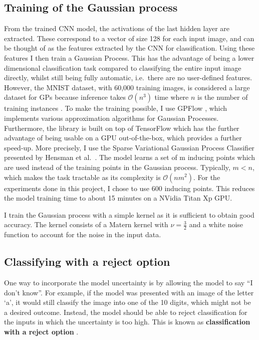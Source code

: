 \documentclass{article}
\begin{document}
\subsection{Training of the Gaussian process}
From the trained CNN model, the activations of the last hidden layer are extracted. These correspond to a vector of size 128 for each input image, and can be thought of as the features extracted by the CNN for classification. Using these features I then train a Gaussian Process. This has the advantage of being a lower dimensional classification task compared to classifying the entire input image directly, whilst still being fully automatic, i.e.\ there are no user-defined features. However, the MNIST dataset, with 60,000 training images, is considered a large dataset for GPs because inference takes $\mathcal{O}(n^3)$ time where $n$ is the number of training instances \cite{hensman2015scalable}. To make the training possible, I use GPFlow \cite{GPflow2017}, which implements various approximation algorithms for Gaussian Processes. Furthermore, the library is built on top of TensorFlow which has the further advantage of being usable on a GPU out-of-the-box, which provides a further speed-up. More precisely, I use the Sparse Variational Gaussian Process Classifier presented by Hensman et al.\ \cite{hensman2015scalable}. The model learns a set of m inducing points which are used instead of the training points in the Gaussian process. Typically, $m < n$, which makes the task tractable as its complexity is $\mathcal{O}(nm^2)$. For the experiments done in this project, I chose to use 600 inducing points. This reduces the model training time to about 15 minutes on a NVidia Titan Xp GPU.

I train the Gaussian process with a simple kernel as it is sufficient to obtain good accuracy. The kernel consists of a Matern kernel  \cite{rasmussen2006gaussian} with $\nu =\frac{3}{2}$ and a white noise function to account for the noise in the input data.

\subsection{Classifying with a reject option}
\label{section/reject_option}
One way to incorporate the model uncertainty is by allowing the model to say ``I don't know''. For example, if the model was presented with an image of the letter `a', it would still classify the image into one of the 10 digits, which might not be a desired outcome. Instead, the model should be able to reject classification for the inputs in which the uncertainty is too high. This is known as \textbf{classification with a reject option} \cite{chow1970optimum}. 
\end{document}
